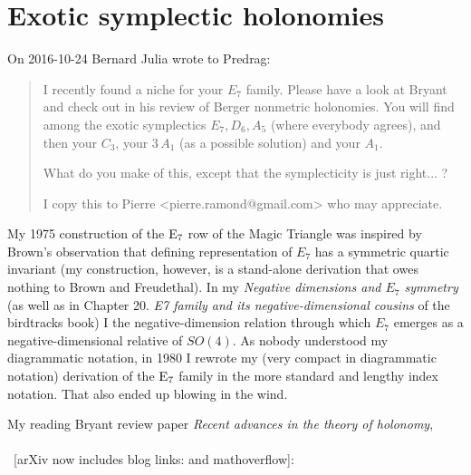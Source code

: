 

\chapter{Exotic symplectic holonomies}
\label{c-holonomies}





On 2016-10-24 Bernard Julia wrote to Predrag:
\begin{quote}
I recently found a niche for your $E_7$ family. Please have a
look at Bryant and check out  in his
review of Berger nonmetric holonomies.
You will find among the exotic symplectics \(E_7, D_6, A_5\) (where everybody
agrees), and then your $C_3$, your $3\,A_1$ (as a possible solution) and your
$A_1$.

What do you make of this, except that the symplecticity is just right... ?

I copy this to Pierre <pierre.ramond@gmail.com> who may appreciate.
\end{quote}

\bigskip

My 1975 construction of the ${\rm E}_7$ row of the Magic
Triangle was inspired by Brown's observation that defining
representation of \(E_7\) has a symmetric quartic invariant (my construction,
however, is a stand-alone derivation that owes nothing to Brown and
Freudethal). In my {\em Negative dimensions and $E_7$
symmetry} (as well as in Chapter 20. {\em E7 family and its
negative-dimensional cousins} of the birdtracks book) I the
negative-dimension relation through which $E_7$ emerges as a
negative-dimensional relative of $SO(4)$.
As nobody understood my diagrammatic notation, in 1980 I rewrote my (very
compact in diagrammatic notation) derivation of the ${\rm E}_7$ family in the more
standard and lengthy index notation. That also ended up
blowing in the wind.

\medskip

My reading Bryant review paper
{\em Recent advances in the theory of holonomy},
\\ 
\\~[arXiv now includes blog links:
and
{mathoverflow}]:


